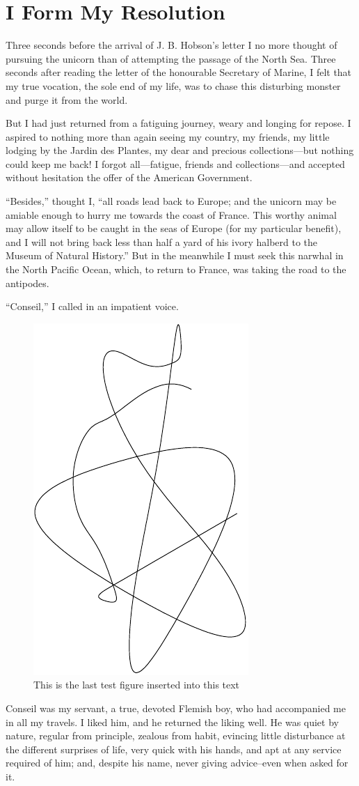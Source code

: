 \chapter{I Form My Resolution}

Three seconds before the arrival of J. B. Hobson's letter I no more thought
of pursuing the unicorn than of attempting the passage of the North Sea.
Three seconds after reading the letter of the honourable Secretary of Marine,
I felt that my true vocation, the sole end of my life, was to chase this
disturbing monster and purge it from the world.

But I had just returned from a fatiguing journey, weary and longing
for repose.  I aspired to nothing more than again seeing my country,
my friends, my little lodging by the Jardin des Plantes,
my dear and precious collections---but nothing could keep me back!
I forgot all---fatigue, friends and collections---and accepted without
hesitation the offer of the American Government.

``Besides,'' thought I, ``all roads lead back to Europe; and the unicorn
may be amiable enough to hurry me towards the coast of France.
This worthy animal may allow itself to be caught in the seas of Europe
(for my particular benefit), and I will not bring back less than half
a yard of his ivory halberd to the Museum of Natural History.''
But in the meanwhile I must seek this narwhal in the North
Pacific Ocean, which, to return to France, was taking the road
to the antipodes.\cite{proceedings-full}

``Conseil,'' I called in an impatient voice.

\begin{figure}%
  \centering%
    \includegraphics[width=100bp]{jules-verne-test}%
  \caption[The last test figure]
  {This is the last test figure inserted into this text}%
  \label{fig:test3}%
\end{figure}

Conseil was my servant, a true, devoted Flemish boy, who had accompanied
me in all my travels.  I liked him, and he returned the liking well.
He was quiet by nature, regular from principle, zealous from habit,
evincing little disturbance at the different surprises of life,
very quick with his hands, and apt at any service required of him;
and, despite his name, never giving advice--even when asked for it.

